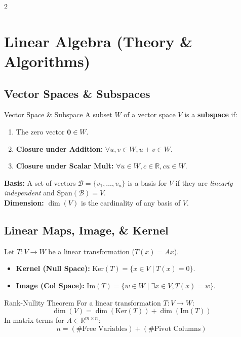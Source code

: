 \documentclass[10pt, letterpaper]{article}
\begin{document}
\small
\begin{multicols*}{2}

\section{Linear Algebra (Theory \& Algorithms)}

\subsection{Vector Spaces \& Subspaces}
\begin{defbox}{Vector Space \& Subspace}
A subset $W$ of a vector space $V$ is a \textbf{subspace} if:
\begin{enumerate}
    \item The zero vector $\mathbf{0} \in W$.
    \item \textbf{Closure under Addition:} $\forall u, v \in W, u+v \in W$.
    \item \textbf{Closure under Scalar Mult:} $\forall u \in W, c \in \mathbb{R}, cu \in W$.
\end{enumerate}
\end{defbox}

\textbf{Basis:} A set of vectors $\mathcal{B} = \{v_1, \dots, v_n\}$ is a basis for $V$ if they are \textit{linearly independent} and $\text{Span}(\mathcal{B}) = V$.
\\
\textbf{Dimension:} $\dim(V)$ is the cardinality of any basis of $V$.

\subsection{Linear Maps, Image, \& Kernel}
Let $T: V \to W$ be a linear transformation ($T(x) = Ax$).
\begin{itemize}
    \item \textbf{Kernel (Null Space):} $\text{Ker}(T) = \{x \in V \mid T(x) = 0\}$.
    \item \textbf{Image (Col Space):} $\text{Im}(T) = \{w \in W \mid \exists x \in V, T(x) = w\}$.
\end{itemize}

\begin{theorbox}{Rank-Nullity Theorem}
For a linear transformation $T: V \to W$:
$$ \dim(V) = \dim(\text{Ker}(T)) + \dim(\text{Im}(T)) $$
In matrix terms for $A \in \mathbb{R}^{m \times n}$:
$$ n = (\text{\# Free Variables}) + (\text{\# Pivot Columns}) $$
\end{theorbox}


\end{multicols*}
\end{document}

